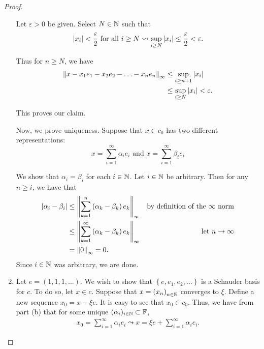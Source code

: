 \begin{proof}
\begin{enumerate}[label=(\alph*)]
    Let $\varepsilon > 0$ be given. Select $N \in \mathbb N$ such that 
    \begin{align*}
	\left\lvert x_{i} \right\rvert < \frac{\varepsilon}{2} \text{ for all } i \ge N \leadsto \sup_{i \ge N} \left\lvert x_{i} \right\rvert \le \frac{\varepsilon}{2} < \varepsilon.
    \end{align*}

    Thus for $n\ge N$, we have 
    \begin{align*}
	\left\lVert x-x_{1}e_{1}-x_{2}e_{2}-\ldots-x_{n}e_{n} \right\rVert_{\infty} &\le \sup_{i \ge n+1} \left\lvert x_{i} \right\rvert \\
	&\le \sup_{i \ge N} \left\lvert x_{i} \right\rvert < \varepsilon.
    \end{align*}

    This proves our claim.

    Now, we prove uniqueness. Suppose that $x\in c_{0}$ has two different representations:
    \begin{equation*}
	x= \sum_{i=1}^{\infty} \alpha_{i} e_{i} \text{ and } x= \sum_{i=1}^{\infty} \beta_{i} e_{i}
    \end{equation*}

    We show that $\alpha_{i} = \beta_{i}$ for each $i\in \mathbb N$. Let $i \in \mathbb N$ be arbitrary. Then for any $n \ge i$, we have that
    \begin{align*}
	\left\lvert \alpha_{i} - \beta_{i} \right\rvert &\le \left\lVert \sum_{k=1}^{n} \left( \alpha_{k} - \beta_{k} \right) e_{k} \right\rVert_{\infty} & \text{by definition of the } \infty \text{ norm} \\
	& \le \left\lVert \sum_{k=1}^{\infty} \left( \alpha_{k} - \beta_{k} \right)e_{k} \right\rVert_{\infty} & \text{let } n \to \infty \\
	& = \left\lVert 0 \right\rVert_{\infty} = 0.
    \end{align*}
    Since $i \in \mathbb N$ was arbitrary, we are done.
    
\item Let $e= \left( 1,1,1, \ldots \right)$. We wish to show that $\left\{ e, e_{1}, e_{2}, \ldots \right\}$ is a Schauder basis for $c$. To do so, let $x\in c$. Suppose that $x=\left( x_{n} \right)_{n\in \mathbb N}$ converges to $\xi$. Define a new sequence $x_{0} = x-\xi e$. It is easy to see that $x_{0} \in c_{0}$. Thus, we have from part (b) that for some unique $(\alpha_{i})_{i\in \mathbb N} \subset \mathbb F $,
    \begin{align*}
	x_{0} = \sum_{i=1}^{\infty} \alpha_{i} e_{i} \leadsto x = \xi e + \sum_{i=1}^{\infty} \alpha_{i} e_{i}.
    \end{align*}


\end{enumerate}
\end{proof}
